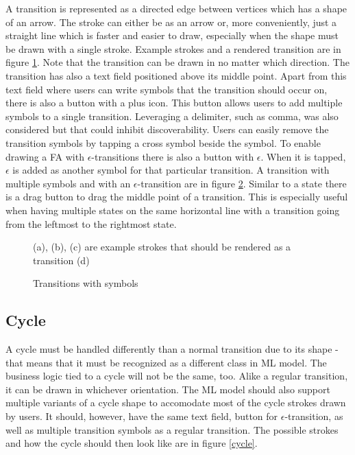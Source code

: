 A transition is represented as a directed edge between vertices which has a shape of an arrow. The stroke can either be as an arrow or, more conveniently, just a straight line which is faster and easier to draw, especially when the shape must be drawn with a single stroke. Example strokes and a rendered transition are in figure \ref{transition}. Note that the transition can be drawn in no matter which direction. The transition has also a text field positioned above its middle point. Apart from this text field where users can write symbols that the transition should occur on, there is also a button with a plus icon. This button allows users to add multiple symbols to a single transition. Leveraging a delimiter, such as comma, was also considered but that could inhibit discoverability. Users can easily remove the transition symbols by tapping a cross symbol beside the symbol. To enable drawing a FA with $\epsilon$-transitions there is also a button with $\epsilon$. When it is tapped, $\epsilon$ is added as another symbol for that particular transition. A transition with multiple symbols and with an $\epsilon$-transition are in figure \ref{transition-symbols}. Similar to a state there is a drag button to drag the middle point of a transition. This is especially useful when having multiple states on the same horizontal line with a transition going from the leftmost to the rightmost state.

\begin{figure}
    \centering
    \caption{(a), (b), (c) are example strokes that should be rendered as a transition (d)}\label{transition}
\end{figure}

\begin{figure}
    \centering
    \caption{Transitions with symbols}\label{transition-symbols}
\end{figure}

\subsection{Cycle}

A cycle must be handled differently than a normal transition due to its shape - that means that it must be recognized as a different class in ML model. The business logic tied to a cycle will not be the same, too. Alike a regular transition, it can be drawn in whichever orientation. The ML model should also support multiple variants of a cycle shape to accomodate most of the cycle strokes drawn by users. It should, however, have the same text field, button for $\epsilon$-transition, as well as multiple transition symbols as a regular transition. The possible strokes and how the cycle should then look like are in figure \ref{cycle}.


